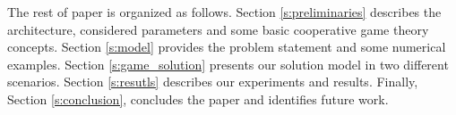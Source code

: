 \documentclass[10pt,journal,cspaper,compsoc]{IEEEtran}
\begin{document}
The rest of paper is organized as follows. Section
\ref{s:preliminaries} describes the architecture, considered
parameters and some basic cooperative game theory concepts.
Section \ref{s:model} provides the problem statement and some numerical examples.
Section \ref{s:game_solution} presents our solution model in two
different scenarios. Section \ref{s:resutls} describes our
experiments and results. Finally, Section \ref{s:conclusion},
concludes the paper and identifies future work.

%
%



%
%
%
%
\end{document}
